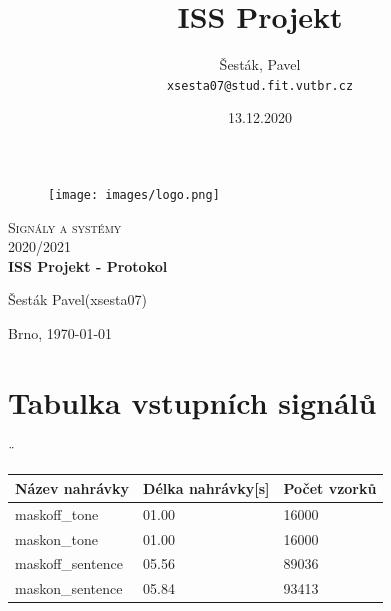 \documentclass[12pt,czech]{article}
\author{
  Šesták, Pavel\\
  \texttt{xsesta07@stud.fit.vutbr.cz}
}
\title{ISS Projekt}
\date{13.12.2020}
\begin{document}
  \begin{titlepage}
		\begin{center}

			\begin{figure}
				\center\texttt{[image: images/logo.png]}
			\end{figure}

			\vspace{3cm}

			\textsc{\LARGE Signály a systémy } \\[0.5cm]
			\textsc{\LARGE 2020/2021} \\[3.5cm]

			\textbf{\LARGE ISS Projekt - Protokol} \\
		    \vspace{3cm}
		    
		    {\Large Šesták Pavel(xsesta07)} \\[0.5cm]
			
			\vspace{3cm}
                
		    \textsc{}{\LARGE Brno, \today}

		\end{center}
	\end{titlepage}

\begin{center}
	\tableofcontents %
	\clearpage %
\end{center}

\section{Tabulka vstupních signálů}¨

\begin{table}[H]
\begin{tabular}{|l|l|l|}
\hline
Název nahrávky                          & Délka nahrávky{[}s{]}      & Počet vzorků                \\ \hline
\multicolumn{1}{|l|}{maskoff\_tone}     & \multicolumn{1}{l|}{01.00} & \multicolumn{1}{l|}{16000} \\ \hline
\multicolumn{1}{|l|}{maskon\_tone}      & \multicolumn{1}{l|}{01.00} & \multicolumn{1}{l|}{16000} \\ \hline
\multicolumn{1}{|l|}{maskoff\_sentence} & \multicolumn{1}{l|}{05.56} & \multicolumn{1}{l|}{89036} \\ \hline
maskon\_sentence                        & 05.84                      & 93413                      \\ \hline
\end{tabular}
\end{table}
\end{document}
